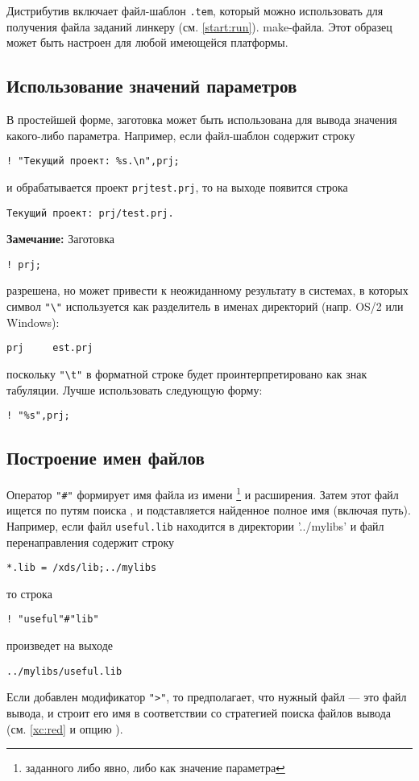 Дистрибутив \XDS{} включает файл-шаблон {\tt \xc{}.tem}, который
можно использовать для получения
\ifgencode
файла заданий линкеру (см. \ref{start:run}).
\fi
\ifgenc
make-файла. Этот образец может быть настроен для любой имеющейся 
платформы.
\fi

\subsection{Использование значений параметров}

В простейшей форме, заготовка может быть использована для вывода
значения какого-либо параметра. Например, если файл-шаблон содержит
строку

\verb'! "Текущий проект: %s.\n",prj;'

и обрабатывается проект {\tt prj\DirSep{}test.prj},
то на выходе появится строка

\verb'Текущий проект: prj/test.prj.'

{\bf Замечание:} Заготовка

\verb'! prj;'

разрешена, но может привести к неожиданному результату в системах,
в которых символ \verb'"\"' используется как разделитель в именах
директорий (напр. OS/2 или Windows):

\verb'prj     est.prj'

поскольку \verb'"\t"' в форматной строке будет проинтерпретировано как
знак табуляции. Лучше использовать следующую форму:

\verb'! "%s",prj;'

\subsection{Построение имен файлов}

Оператор \verb|"#"| формирует имя файла из имени
\footnote{заданного либо явно, либо как значение параметра} и расширения.
Затем этот файл ищется по путям поиска
\XDS{}, и подставляется найденное полное имя (включая путь).
Например, если файл \verb'useful.lib' 
находится в директории '../mylibs'
и файл перенаправления содержит строку

\verb'*.lib = /xds/lib;../mylibs'

то строка

\verb'! "useful"#"lib"'

произведет на выходе

\verb'../mylibs/useful.lib'

Если добавлен модификатор \verb|">"|, то \XDS{} предполагает, что
нужный файл --- это файл вывода, и строит его имя в соответствии со
стратегией поиска файлов вывода
(см. \ref{xc:red} и опцию ).


